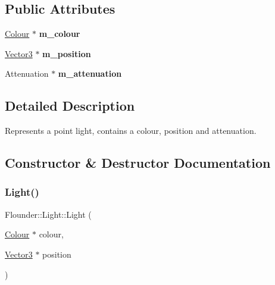 \subsection*{Public Attributes}
\begin{DoxyCompactItemize}
\item 
\mbox{\label{class_flounder_1_1_light_acdc737c47dde7f121738da066c538678}} 
\hyperlink{class_flounder_1_1_colour}{Colour} $\ast$ {\bfseries m\+\_\+colour}
\item 
\mbox{\label{class_flounder_1_1_light_a7ff0970c2c719338d3ff6dfb3008b32c}} 
\hyperlink{class_flounder_1_1_vector3}{Vector3} $\ast$ {\bfseries m\+\_\+position}
\item 
\mbox{\label{class_flounder_1_1_light_a48bb884e12accdf97f79684f7c8b864e}} 
Attenuation $\ast$ {\bfseries m\+\_\+attenuation}
\end{DoxyCompactItemize}


\subsection{Detailed Description}
Represents a point light, contains a colour, position and attenuation. 



\subsection{Constructor \& Destructor Documentation}
\mbox{\label{class_flounder_1_1_light_a264f87572b1a08c6055d053ca1ec7723}} 
\subsubsection{\texorpdfstring{Light()}{Light()}\hspace{0.1cm}{\footnotesize\ttfamily [1/2]}}
{\footnotesize\ttfamily Flounder\+::\+Light\+::\+Light (\begin{DoxyParamCaption}\item[{\hyperlink{class_flounder_1_1_colour}{Colour} $\ast$}]{colour,  }\item[{\hyperlink{class_flounder_1_1_vector3}{Vector3} $\ast$}]{position }\end{DoxyParamCaption})}



